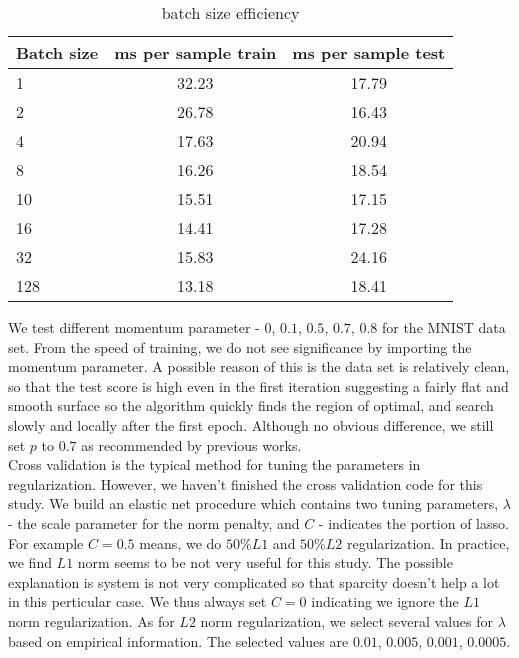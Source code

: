 \documentclass[paper=a4, fontsize=11pt]{scrartcl} %
\numberwithin{equation}{section} %
\numberwithin{figure}{section} %
\numberwithin{table}{section} %
\begin{document}
\begin{table}[h]
 \centering 
\begin{tabular}{lcc}  
\hline
Batch size & ms per sample train &ms per sample test \\ \hline  
1 & 32.23 & 17.79 \\         
2 & 26.78 & 16.43 \\        
4 & 17.63 & 20.94 \\ 
8 &  16.26 &  18.54 \\
10 & 15.51 & 17.15 \\
16 & 14.41 & 17.28\\
32 & 15.83 & 24.16  \\
128 & 13.18 & 18.41  \\         \hline
\end{tabular}
\caption{batch size efficiency}
\end{table}
\newpage
We test different momentum parameter - $0$, $0.1$, $0.5$, $0.7$, $0.8$ for the MNIST data set. From the speed of training, we do not see significance by importing the momentum parameter. A possible reason of this is the data set is relatively clean, so that the test score is high even in the first iteration suggesting a fairly flat and smooth surface so the algorithm quickly finds the region of optimal, and search slowly and locally after the first epoch. Although no obvious difference, we still set $p$ to $0.7$ as recommended by previous works.\\

Cross validation is the typical method for tuning the parameters in regularization. However, we haven't finished the cross validation code for this study. We build an elastic net procedure which contains two tuning parameters, $\lambda$ - the scale parameter for the norm penalty, and $C$ - indicates the portion of lasso. For example $C=0.5$ means, we do $50\% L1$ and $50\% L2$ regularization. In practice, we find $L1$ norm seems to be not very useful for this study. The possible explanation is system is not very complicated so that sparcity doesn't help a lot in this perticular case. We thus always set $C=0$ indicating we ignore the $L1$ norm regularization. As for $L2$ norm regularization, we select several values for $\lambda$ based on empirical information. The selected values are $0.01$, $0.005$, $0.001$, $0.0005$.
\end{document}
